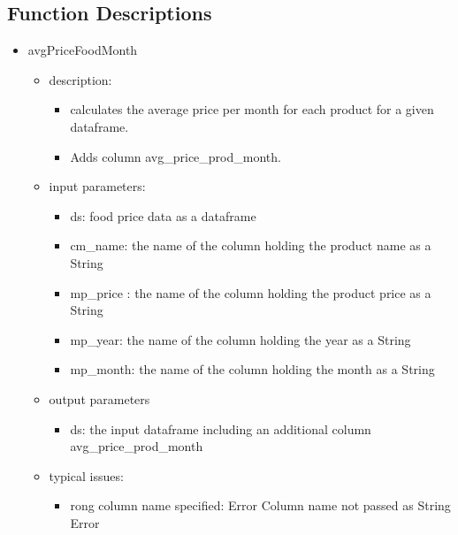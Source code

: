 \documentclass[12pt,a4paper,english]{article}
\begin{document}
\subsection{Function Descriptions}
\begin{itemize}
\item avgPriceFoodMonth
	\begin{itemize}
	\item description: 
		\begin{itemize}
		\item calculates the average price per month for each product for a given dataframe. 
		\item Adds column avg\_price\_prod\_month.
		\end{itemize}
	\item input parameters: 
		\begin{itemize}
		\item ds: food price data as a dataframe 
		\item cm\_name: the name of the column holding the product name as a String        
		\item mp\_price : the name of the column holding the product price as a String        
		\item mp\_year: the name of the column holding the year as a String       
		\item mp\_month: the name of the column holding the month as a String
		\end{itemize}
	\item output parameters
		\begin{itemize}
		\item ds: the input dataframe including an additional column avg\_price\_prod\_month
		\end{itemize}
	\item typical issues:
		\begin{itemize}
		\item rong column name specified: Error  Column name not passed as String Error
		\end{itemize}
	\end{itemize}



\end{itemize}
\end{document}
